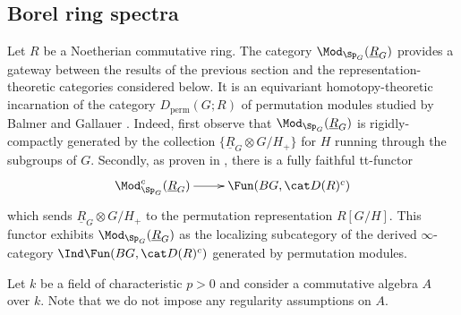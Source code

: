 \documentclass{amsart}%
\numberwithin{equation}{section}%
\theoremstyle{remark}
\begin{document}
\subsection{Borel ring spectra}

Let $R$ be a Noetherian commutative ring. The category $\Mod_{\Sp_G}(\underline{R}_G)$ provides a gateway between the results of the previous section and the representation-theoretic categories considered below. It is an equivariant homotopy-theoretic incarnation of the category $D_{\mathrm{perm}}(G;R)$ of permutation modules studied by Balmer and Gallauer \cite{balmergallauer_permmodulesres,balmergallauer_permutationmodulescohomsing}. Indeed, first observe that $\Mod_{\Sp_G}(\underline{R}_G)$ is rigidly-compactly generated by the collection $\{\underline{R}_G \otimes G/H_+\}$ for $H$ running through the subgroups of $G$. Secondly, as proven in \cite[Cor.~6.21]{MathewNaumannNoel17}, there is a fully faithful tt-functor
\[
\xymatrix{\Mod_{\Sp_G}^c(\underline{R}_G) \ar[r] & \Fun(BG,\cat D(R)^c)}
\]
which sends $\underline{R}_G \otimes G/H_+$ to the permutation representation $R[G/H]$. This functor exhibits $\Mod_{\Sp_G}(\underline{R}_G)$ as the localizing subcategory of the derived $\infty$-category $\Ind\Fun(BG,\cat D(R)^c)$ generated by permutation modules. 

Let $k$ be a field of characteristic $p>0$ and consider a commutative algebra $A$ over $k$. Note that we do not impose any regularity assumptions on $A$.
\end{document}
